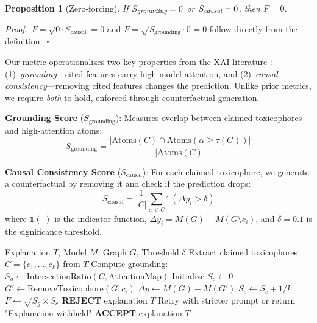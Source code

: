 \documentclass[conference]{IEEEtran}
\begin{document}
\textbf{Proposition 1} (Zero-forcing). \textit{If $S_{\emph{grounding}} = 0$ or $S_{\emph{causal}} = 0$, then $F = 0$.}

\textit{Proof.}~$F = \sqrt{0 \cdot S_{\text{causal}}} = 0$ and $F = \sqrt{S_{\text{grounding}} \cdot 0} = 0$ follow directly from the definition.~$\square$

Our metric operationalizes two key properties from the XAI literature \cite{jain2019attention}: (1)~\textit{grounding}---cited features carry high model attention, and (2)~\textit{causal consistency}---removing cited features changes the prediction. Unlike prior metrics, we require \emph{both} to hold, enforced through counterfactual generation.


\textbf{Grounding Score} ($S_{\text{grounding}}$): Measures overlap between claimed toxicophores and high-attention atoms:
\begin{equation}
    S_{\text{grounding}} = \frac{|\text{Atoms}(C) \cap \text{Atoms}(\alpha \geq \tau(G))|}{|\text{Atoms}(C)|}
\end{equation}

\textbf{Causal Consistency Score} ($S_{\text{causal}}$): For each claimed toxicophore, we generate a counterfactual by removing it and check if the prediction drops:
\begin{equation}
    S_{\text{causal}} = \frac{1}{|C|} \sum_{c_i \in C} \mathbb{1}(\Delta y_i > \delta)
\end{equation}
where $\mathbb{1}(\cdot)$ is the indicator function, $\Delta y_i = M(G) - M(G \setminus c_i)$, and $\delta = 0.1$ is the significance threshold.

\begin{algorithm}
\caption{Faithfulness Validation Loop}
\begin{algorithmic}[1]
\REQUIRE Explanation $T$, Model $M$, Graph $G$, Threshold $\delta$
\STATE Extract claimed toxicophores $C = \{c_1, \ldots, c_k\}$ from $T$
\STATE Compute grounding: $S_g \leftarrow \text{IntersectionRatio}(C, \text{AttentionMap})$
\STATE Initialize $S_c \leftarrow 0$
    \STATE $G' \leftarrow \text{RemoveToxicophore}(G, c_i)$
        \STATE $\Delta y \leftarrow M(G) - M(G')$
            \STATE $S_c \leftarrow S_c + 1/k$
        \ENDIF
    \ENDIF
\ENDFOR
\STATE $F \leftarrow \sqrt{S_g \times S_c}$
    \STATE \textbf{REJECT} explanation $T$
    \STATE Retry with stricter prompt or return "Explanation withheld"
\ELSE
    \STATE \textbf{ACCEPT} explanation $T$
\ENDIF
\end{algorithmic}
\end{algorithm}
\end{document}
